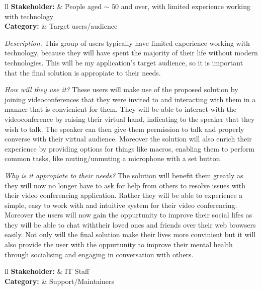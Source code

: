 \noindent
\begin{tblr}{ll}
  \textsf{\bfseries Stakeholder: } & {People aged $\sim$ 
  \hspace{-0.2cm} $50$ and over, with limited experience
  working with technology}\\
  \textsf{\bfseries Category: } & Target users/audience\\
\end{tblr}
\vspace{0.2cm}

\textit{Description.}  
This group of users typically have limited experience working 
with technology, because they will have spent the majority of
their life without modern technologies. This will be my 
application's target audience, so it is important that the 
final solution is appropiate to their needs. \vspace{0.2cm}

\textit{How will they use it?}
These users will make use of the proposed solution by joining
videoconferences that they were invited to and interacting with
them in a manner that is convienient for them. They will be 
able to interact with the videoconference by raising their 
virtual hand, indicating to the speaker that they wish to talk.
The speaker can then give them permission to talk and properly
converse with their virtual audience. Moreover the solution
will also enrich their experience by providing options for
things like macros, enabling them to perform common tasks,
like muting/unmuting a microphone with a set button.
\vspace{0.2cm}

\textit{Why is it appropiate to their needs?}
The solution will benefit them greatly as they will now no 
longer have to ask for help from others to resolve issues with
their video conferencing application. Rather they will be able
to experience a simple, easy to work with and intuitive system
for their video conferencing. Moreover the users will now gain
the oppurtunity to improve their social lifes as they will be
able to chat withtheir loved ones and friends over their web 
browsers easily. Not only will the final solution make their 
lives more convinient but it will also provide the user with
the oppurtunity to improve their mental health through
socialising and engaging in conversation with others.
\cite{social}
\vspace{0.2cm}

\noindent
\begin{tblr}{ll}
  \textsf{\bfseries Stakeholder: } & IT Staff\\
  \textsf{\bfseries Category: } & Support/Maintainers\\
\end{tblr}
\vspace{0.2cm}

